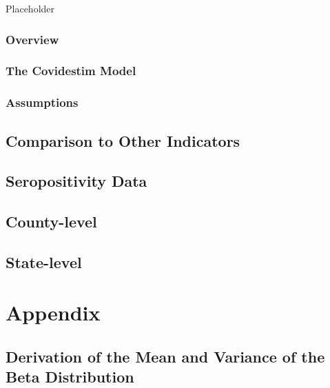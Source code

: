 \documentclass[12pt,twoside]{smiththesis}
\begin{document}
Placeholder

\hypertarget{overview}{%
\subsection{Overview}\label{overview}}

\hypertarget{the-covidestim-model}{%
\subsection{The Covidestim Model}\label{the-covidestim-model}}

\hypertarget{assumptions}{%
\subsection{Assumptions}\label{assumptions}}

\hypertarget{comparison-to-other-indicators}{%
\section{Comparison to Other Indicators}\label{comparison-to-other-indicators}}

\hypertarget{seropositivity-data}{%
\section{Seropositivity Data}\label{seropositivity-data}}

\hypertarget{county-level}{%
\section{County-level}\label{county-level}}

\hypertarget{state-level}{%
\section{State-level}\label{state-level}}

\appendix

\hypertarget{appendix}{%
\chapter{Appendix}\label{appendix}}

\hypertarget{derivation-of-the-mean-and-variance-of-the-beta-distribution}{%
\section{Derivation of the Mean and Variance of the Beta Distribution}\label{derivation-of-the-mean-and-variance-of-the-beta-distribution}}
\end{document}
